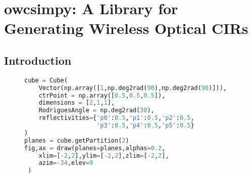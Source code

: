 \chapter{owcsimpy: A Library for Generating Wireless Optical CIRs}
\label{ch:app_owcsimpy}

\section{Introduction}

    \lipsum[2]

        \begin{figure}[h]
        \begin{lstlisting}[language=Python, caption=A Python snippet to generate a cuboid, label=lis:app_owcsimpy:cuboid]
cube = Cube(
    Vector(np.array([1,np.deg2rad(90),np.deg2rad(90)])),
    ctrPoint = np.array([0.5,0.5,0.5]),
    dimensions = [2,1,1],
    RodriguesAngle = np.deg2rad(30),
    reflectivities={'p0':0.5,'p1':0.5,'p2':0.5,
                    'p3':0.5,'p4':0.5,'p5':0.5}
)
planes = cube.getPartition(2)
fig,ax = draw(planes=planes,alphas=0.2,
    xlim=[-2,2],ylim=[-2,2],zlim=[-2,2],
    azim=-34,elev=9
 )
            \end{lstlisting}
        \end{figure}


